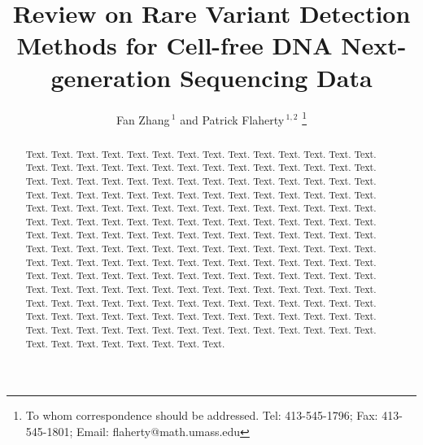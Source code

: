 \documentclass[a4,center,fleqn]{NAR}
\begin{document}
\title{Review on Rare Variant Detection Methods for Cell-free DNA Next-generation Sequencing Data}

\author{%
Fan Zhang\,$^{1}$
and Patrick Flaherty\,$^{1, 2}$
\footnote{To whom correspondence should be addressed.
Tel: 413-545-1796; Fax: 413-545-1801; Email: flaherty@math.umass.edu}}



\address{%
$^{1}$Department of Biomedical Engineering, Worcester Polytechnic Institute, MA, USA
and
$^{2}$Department of Mathematics and Statistics, University of Massachusetts, Amherst, MA, USA}


\maketitle

\begin{abstract}
Text. Text. Text. Text. Text. Text. Text. Text. Text. Text. Text.
Text. Text. Text. Text. Text. Text. Text. Text. Text. Text. Text.
Text. Text. Text. Text. Text. Text. Text. Text. Text. Text. Text.
Text. Text. Text. Text. Text. Text. Text. Text. Text. Text. Text.
Text. Text. Text. Text. Text. Text. Text. Text. Text. Text. Text.
Text. Text. Text. Text. Text. Text. Text. Text. Text. Text. Text.
Text. Text. Text. Text. Text. Text. Text. Text. Text. Text. Text.
Text. Text. Text. Text. Text. Text. Text. Text. Text. Text. Text.
Text. Text. Text. Text. Text. Text. Text. Text. Text. Text. Text.
Text. Text. Text. Text. Text. Text. Text. Text. Text. Text. Text.
Text. Text. Text. Text. Text. Text. Text. Text. Text. Text. Text.
Text. Text. Text. Text. Text. Text. Text. Text. Text. Text. Text.
Text. Text. Text. Text. Text. Text. Text. Text. Text. Text. Text.
Text. Text. Text. Text. Text. Text. Text. Text. Text. Text. Text.
Text. Text. Text. Text. Text. Text. Text. Text. Text. Text. Text.
Text. Text. Text. Text. Text. Text. Text. Text. Text. Text. Text.
Text. Text. Text. Text. Text. Text. Text. Text. Text. Text. Text.
Text. Text. Text. Text. Text. Text. Text. Text. Text. Text. Text.
Text. Text. Text. Text. Text. Text.
\end{abstract}
\end{document}
